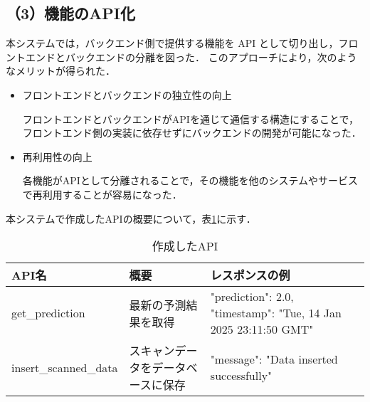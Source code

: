 \subsection*{（3）機能のAPI化}
本システムでは，バックエンド側で提供する機能を API として切り出し，フロントエンドとバックエンドの分離を図った．
このアプローチにより，次のようなメリットが得られた．

\begin{itemize}
	\item フロントエンドとバックエンドの独立性の向上
	
	フロントエンドとバックエンドがAPIを通じて通信する構造にすることで，フロントエンド側の実装に依存せずにバックエンドの開発が可能になった．
	
	\item 再利用性の向上
	 
	各機能がAPIとして分離されることで，その機能を他のシステムやサービスで再利用することが容易になった．
	
\end{itemize}

本システムで作成したAPIの概要について，表\ref{tbl:API}に示す．

\begin{table}[tb]
	\centering
	\caption{作成したAPI}
	\label{tbl:API}
	\small
	\doublerulesep=0.3pt
    \begin{tabular}{l|l|p{6cm}} \hline\hline\hline
		API名 & 概要 & レスポンスの例 \\ \hline
		get\_prediction & 最新の予測結果を取得 & {"prediction": 2.0, "timestamp": "Tue, 14 Jan 2025 23:11:50 GMT"} \\ \hline
		insert\_scanned\_data & スキャンデータをデータベースに保存 & {"message": "Data inserted successfully"} \\ \hline\hline\hline
	\end{tabular}
\end{table}